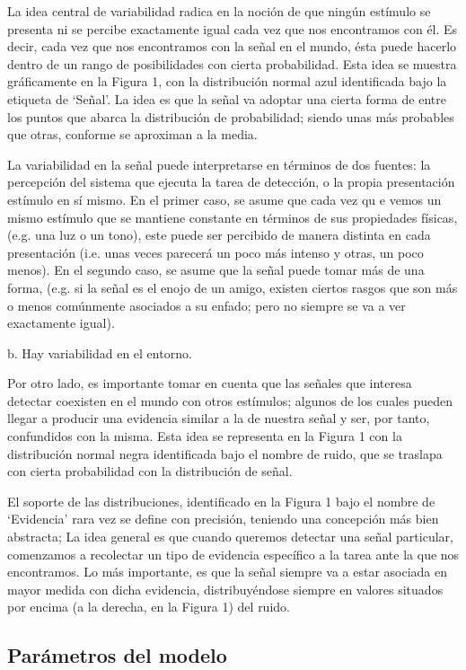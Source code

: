 La idea central de variabilidad radica en la noción de que ningún estímulo se presenta ni se percibe exactamente igual cada vez que nos encontramos con él.  Es decir, cada vez que nos encontramos con la  señal en el mundo, ésta puede hacerlo dentro de un rango de posibilidades con cierta probabilidad. Esta idea se muestra gráficamente en la Figura 1, con la distribución normal azul identificada bajo la etiqueta de ‘Señal’. La idea es que la señal va adoptar una cierta forma de entre los puntos que abarca la distribución de probabilidad; siendo unas más probables que otras, conforme se aproximan a la media.

La variabilidad en la señal puede interpretarse en términos de dos fuentes: la percepción del sistema que ejecuta la tarea de detección, o la propia presentación estímulo en sí mismo. En el primer caso, se asume que cada vez qu e vemos un mismo estímulo que se mantiene constante en términos de sus propiedades físicas,  (e.g. una luz o un tono),  este puede ser percibido de manera distinta en cada presentación (i.e. unas veces parecerá un poco más intenso y otras, un poco menos). En el segundo caso, se asume que la señal puede tomar más de una forma, (e.g. si la señal es el enojo de un amigo, existen ciertos rasgos que son más o menos comúnmente asociados a su enfado; pero no siempre se va a ver exactamente igual).

b.	Hay variabilidad en el entorno.

Por otro lado, es importante tomar en cuenta que las señales que interesa detectar coexisten en el mundo con otros estímulos; algunos de los cuales pueden llegar a producir una evidencia similar a la de nuestra señal y ser, por tanto, confundidos con la misma. Esta idea se representa en la Figura 1 con la distribución normal negra identificada bajo el nombre de ruido, que se traslapa con cierta probabilidad con la distribución de señal.


El soporte de las distribuciones, identificado en la Figura 1 bajo el nombre de ‘Evidencia’ rara vez se define con precisión,  teniendo una concepción más bien abstracta; La idea general es que cuando queremos detectar una señal particular, comenzamos a recolectar un tipo de evidencia específico a la tarea ante la que nos encontramos. Lo más importante, es que la señal siempre va a estar asociada en mayor medida con dicha evidencia, distribuyéndose siempre en valores situados por encima (a la derecha, en la Figura 1) del ruido.


\subsection{Parámetros del modelo}


